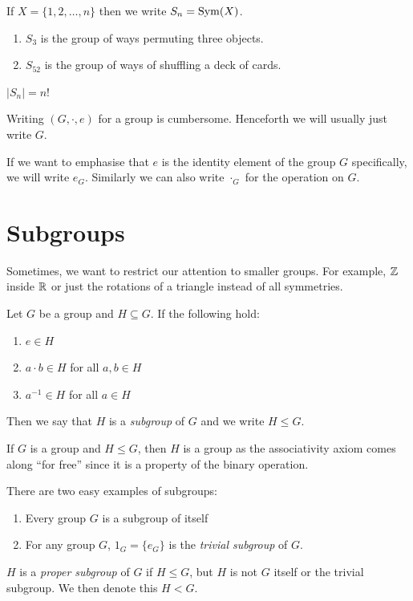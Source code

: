 \documentclass[../main.tex]{subfiles}
\begin{document}
\begin{definition}
  If $X = \{1, 2, \ldots, n\}$ then we write $S_n = \operatorname{Sym}(X)$.
\end{definition}
\begin{example}
  \begin{enumerate}
    \item $S_3$ is the group of ways permuting three objects.
    \item $S_{52}$ is the group of ways of shuffling a deck of cards.
  \end{enumerate}
\end{example}
\begin{remark}
  $|S_n| = n!$
\end{remark}
\begin{remark}[Notation]
  Writing  $(G, \cdot, e)$ for a group is cumbersome.
  Henceforth we will usually just write $G$.

  If we want to emphasise that $e$ is the identity element of the group $G$ specifically, we will write $e_G$.
  Similarly we can also write $\cdot_G$ for the operation on $G$.
\end{remark}

\section{Subgroups}
Sometimes, we want to restrict our attention to smaller groups. For example, $\mathbb{Z}$ inside $\mathbb{R}$ or just the rotations of a triangle instead of all symmetries.
\begin{definition}[Subgroup]
  Let $G$ be a group and $H \subseteq G$. If the following hold:
  \begin{enumerate}
    \item $e \in H$
    \item $a \cdot b \in H$ for all $a, b \in H$
    \item $a^{-1} \in H$ for all $a \in H$
  \end{enumerate}
  Then we say that $H$ is a \textit{subgroup} of $G$ and we write $H \leq G$.
\end{definition}
\begin{remark}
  If $G$ is a group and $H \leq G$, then $H$ is a group as the associativity axiom comes along ``for free'' since it is a property of the binary operation.
\end{remark}
\begin{example}
  There are two easy examples of subgroups:
  \begin{enumerate}
    \item Every group $G$ is a subgroup of itself
    \item For any group $G$, $1_G = \{e_G\}$ is the \textit{trivial subgroup} of $G$.
  \end{enumerate}
\end{example}
\begin{definition}
  $H$ is a \textit{proper subgroup} of $G$ if $H \leq G$, but $H$ is not $G$ itself or the trivial subgroup.
  We then denote this $H < G$.
\end{definition}
\end{document}
